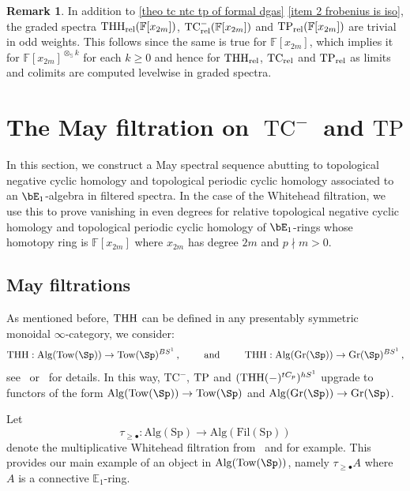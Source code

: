 \documentclass[english,10pt]{amsart}
\newcommand{\RomanNumeralCaps}[1]
    {\MakeUppercase{\romannumeral #1}}
\newcommand{\sph}{\mathbb{S}}
\newcommand{\rel}{\textup{rel}}
\newcommand{\field}{\mathbb{F}}
\theoremstyle{definition}
\newtheorem{rema}{Remark}[section]
\numberwithin{equation}{section}
\DeclareMathOperator{\TC}{TC}
\newcommand{\ntc}{\mathrm{TC}^{-}}
\DeclareMathOperator{\tp}{\ensuremath{\textup{TP}}}
\DeclareMathOperator{\thh}{\ensuremath{\textup{THH}}}
\newcommand{\THH}{\thh}
\newcommand{\rntc}{\mathrm{TC}_{\rel}^{-}}
\newcommand{\rtp}{\mathrm{TP}_{\rel}}
\newcommand{\rtc}{\mathrm{TC}_{\rel}}
\newcommand{\rthh}{\mathrm{THH}_{\rel}}
\newcommand{\Tow}{\mathrm{Tow}}
\newcommand{\Alg}{\mathrm{Alg}}
\newcommand{\TP}{\mathrm{TP}}
\newcommand{\Gr}{\textup{Gr}}
\begin{document}
\begin{rema}\label{rema trivial in odd weights}
In addition to \autoref{theo tc ntc tp of formal dgas} \eqref{item 2 frobenius is iso}, the graded spectra $\rthh(\field[x_{2m}])$, $\rntc(\field[x_{2m}])$ and $\rtp(\field[x_{2m}])$ are trivial in odd weights. This follows since the same is true for $\field[x_{2m}]$, which implies it for $\field[x_{2m}]^{\otimes_{\sph} k}$ for each $k\geq 0$ and hence for $\rthh$, $\rtc$ and $\rtp$ as limits and colimits are computed levelwise in graded spectra.
\end{rema}

\section{The May filtration on \texorpdfstring{$\TC^{-}$}{topological negative cyclic homology} and \texorpdfstring{$\TP$}{topological periodic cyclic homology}}\label{Whitehead}
In this section, we construct a May spectral sequence abutting to topological negative cyclic homology and topological periodic cyclic homology associated to an $\bE_1$-algebra in filtered spectra. In the case of the Whitehead filtration, we use this to prove vanishing in even degrees for relative topological negative cyclic homology and topological periodic cyclic homology of $\bE_1$-rings whose homotopy ring is $\field[x_{2m}]$ where $x_{2m}$ has degree $2m$ and $p\nmid m>0$.

\subsection{May filtrations}\label{sec:may-filtrations}
As mentioned before, $\THH$ can be defined in any presentably symmetric monoidal $\infty$-category, we consider: 
\[ \THH : \Alg(\Tow(\Sp))  \to \Tow(\Sp)^{BS^1}\,, \qquad
\text{ and } \qquad
\THH : \Alg(\Gr(\Sp))  \to \Gr(\Sp)^{BS^1}\,, \]
see~\cite[Definition~4.6,~Proposition 4.8, Definition~5.8]{Kee25} or~\cite[Appendix A]{antieau2020beilinson} for details. In this way, $\ntc$, $\tp$ and $(\thh(-)^{tC_p})^{hS^1}$ upgrade to functors of the form $ \Alg(\Tow(\Sp))  \to \Tow(\Sp)$ and  $ \Alg(\Gr(\Sp))  \to \Gr(\Sp)$. 

Let 
\begin{equation}\label{monoidal-Whitehead}
\tau_{\ge \bullet} : \mathrm{Alg}(\mathrm{Sp})\longrightarrow  \mathrm{Alg}(\mathrm{Fil}(\mathrm{Sp})) 
\end{equation}
denote the multiplicative Whitehead filtration from~\cite[1.4.3.4,7.4.3.11]{lurie2016higher} and \cite[Proposition \RomanNumeralCaps{2}.1.26]{hedenlund2020multiplicative} for example. This provides our main example of an object in $\Alg(\Tow(\Sp))$, namely $\tau_{\ge \bullet}A$ where $A$ is a connective $\mathbb{E}_1$-ring. 
\end{document}

